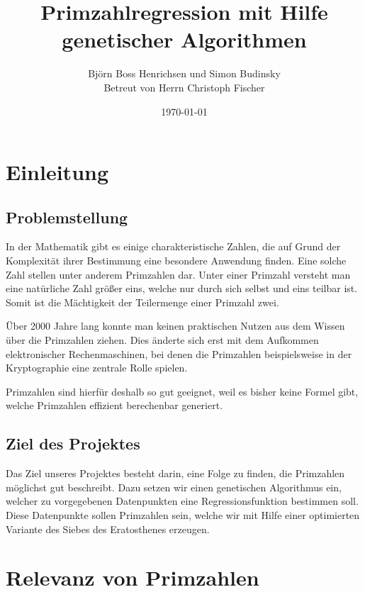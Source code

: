 \documentclass[a4paper,12pt]{article}
\begin{document}
\begin{titlepage}
\title{Primzahlregression mit Hilfe genetischer Algorithmen}
\author{Björn Boss Henrichsen und Simon Budinsky\\Betreut von Herrn Christoph Fischer}
\date{\today}
\maketitle
\newpage
\end{titlepage}

\tableofcontents
\newpage

\section{Einleitung}
\subsection{Problemstellung}
In der Mathematik gibt es einige charakteristische Zahlen, die auf Grund der Komplexität ihrer Bestimmung eine besondere Anwendung finden. Eine solche Zahl stellen unter anderem Primzahlen dar. Unter einer Primzahl versteht man eine natürliche Zahl größer eins, welche nur durch sich selbst und eins teilbar ist. Somit ist die Mächtigkeit der Teilermenge einer Primzahl zwei.

Über 2000 Jahre lang konnte man keinen praktischen Nutzen aus dem Wissen über die Primzahlen ziehen. Dies änderte sich erst mit dem Aufkommen elektronischer Rechenmaschinen, bei denen die Primzahlen beispielsweise in der Kryptographie eine zentrale Rolle spielen.

Primzahlen sind hierfür deshalb so gut geeignet, weil es bisher keine Formel gibt, welche Primzahlen effizient berechenbar generiert. 
\subsection{Ziel des Projektes}
Das Ziel unseres Projektes besteht darin, eine Folge zu finden, die Primzahlen möglichst gut beschreibt. Dazu setzen wir einen genetischen Algorithmus ein, welcher zu vorgegebenen Datenpunkten eine Regressionsfunktion bestimmen soll. Diese Datenpunkte sollen Primzahlen sein, welche wir mit Hilfe einer optimierten Variante des Siebes des Eratosthenes erzeugen.

\newpage

\section{Relevanz von Primzahlen}
\end{document}
